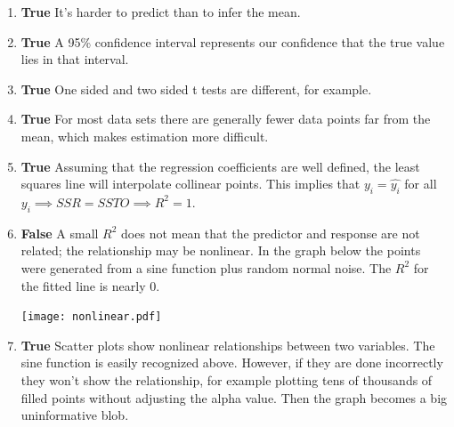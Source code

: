 \documentclass[12pt]{article}
\begin{document}
\begin{enumerate}[label=\alph*]
\item \textbf{True} It's harder to predict than to infer the mean.

\item \textbf{True} A 95\% confidence interval represents our confidence that
the true value lies in that interval.

\item \textbf{True} One sided and two sided t tests are different, for
example.

\item \textbf{True} For most data sets there are generally fewer data points far from the mean,
which makes estimation more difficult. 

\item \textbf{True} Assuming that the regression coefficients are well 
defined, the least squares line will interpolate collinear points. This
implies that $y_i = \hat{y_i}$ for all $y_i \implies SSR = SSTO \implies R^2 = 1$.

\item \textbf{False} A small $R^2$ does not mean that the predictor and
response are not related; the relationship may be nonlinear. In the graph
below the points were generated from a sine function plus random normal
noise. The $R^2$ for the fitted line is nearly 0.

\centerline{\texttt{[image: nonlinear.pdf]}}

\item \textbf{True} Scatter plots show nonlinear relationships between two
variables. The sine function is easily recognized above. However, if they are done incorrectly they won't show the
relationship, for example plotting tens of thousands of filled points without adjusting the
alpha value. Then the graph becomes a big uninformative blob.

\end{enumerate}
\end{document}
